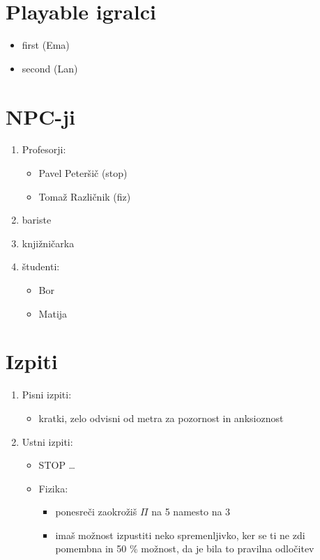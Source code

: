 \documentclass[a4paper]{article}
\begin{document}
\section{Playable igralci}
\begin{itemize}
    \item first (Ema)
    \item second (Lan)
\end{itemize}

\section{NPC-ji}
\begin{enumerate}
    \item Profesorji: \begin{itemize}
        \item Pavel Peteršič (stop)
        \item Tomaž Različnik (fiz)
    \end{itemize}
    \item bariste
    \item knjižničarka
    \item študenti: \begin{itemize}
        \item Bor
        \item Matija
    \end{itemize}
\end{enumerate}

\section{Izpiti}
\begin{enumerate}
    \item Pisni izpiti: \begin{itemize}
        \item kratki, zelo odvisni od metra za pozornost in anksioznost
    \end{itemize}

    \item Ustni izpiti: \begin{itemize}
        \item STOP\: \ldots
        \item Fizika: \begin{itemize}
            \item ponesreči zaokrožiš $\Pi$ na 5 namesto na 3
            \item imaš možnost izpustiti neko spremenljivko, ker se ti ne zdi\\
            pomembna in 50 \% možnost, da je bila to pravilna odločitev
        \end{itemize}
    \end{itemize}
\end{enumerate}
\end{document}
